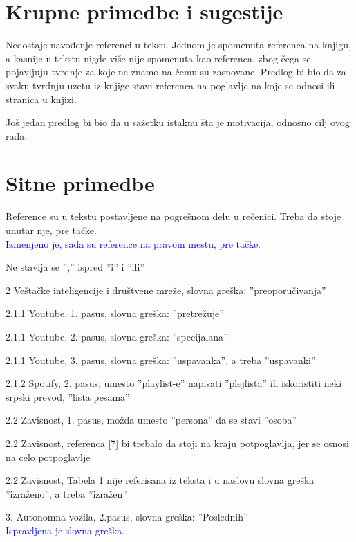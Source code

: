 \documentclass[a4paper]{report}
\newcommand{\odgovor}[1]{\textcolor{blue}{#1}}
\begin{document}
\section{Krupne primedbe i sugestije}
Nedostaje navođenje referenci u teksu. Jednom je spomenuta referenca na knjigu, a kasnije u tekstu nigde više nije spomenuta kao referenca, zbog čega se pojavljuju tvrdnje za koje ne znamo na čemu su zasnovane. Predlog bi bio da za svaku tvrdnju uzetu iz knjige stavi referenca na poglavlje na koje se odnosi ili stranica u knjizi.

Još jedan predlog bi bio da u sažetku istaknu šta je motivacija, odnosno cilj ovog rada.


\section{Sitne primedbe}
Reference su u tekstu postavljene na pogrešnom delu u rečenici. Treba da stoje unutar nje, pre tačke. \\
\odgovor{Izmenjeno je, sada su reference na pravom mestu, pre tačke.}

Ne stavlja se '','' ispred ''i'' i ''ili''

2 Veštačke inteligencije i društvene mreže, slovna greška: ''preoporučivanja''

2.1.1 Youtube, 1. pasus, slovna greška: ''pretrežuje''

2.1.1 Youtube, 2. pasus, slovna greška: ''specijalana''

2.1.1 Youtube, 3. pasus, slovna greška: ''uspavanka'', a treba ''uspavanki''

2.1.2 Spotify, 2. pasus, umesto ''playlist-e'' napisati ''plejlista'' ili iskoristiti neki srpski prevod, ''lista pesama''

2.2 Zavisnost, 1. pasus, možda umesto ''persona'' da se stavi ''osoba''

2.2 Zavisnost, referenca [7] bi trebalo da stoji na kraju potpoglavlja, jer se osnosi na celo potpoglavlje

2.2 Zavisnost, Tabela 1 nije referisana iz teksta i u naslovu slovna greška ''izraženo'', a treba ''izražen''

3. Autonomna vozila, 2.pasus, slovna greška: ''Poslednih'' \\
\odgovor{Ispravljena je slovna greška.}
\end{document}
